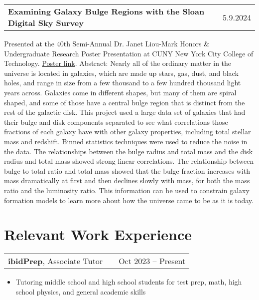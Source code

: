 \documentclass[a4paper,12pt]{article}
\makeatletter
\newenvironment{jobshort}[2]
    {
    \begin{tabularx}{\linewidth}{@{}X r@{}}
    {\raggedright\arraybackslash\nohyphens{#1}} & #2 \\[3.75pt]
    \end{tabularx}
    }
    {}
\newenvironment{joblong}[2]
    {
    \begin{tabularx}{\linewidth}{@{}l X r@{}}
    #1 & \hfill &  #2 \\[3.75pt]
    \end{tabularx}
    \begin{minipage}[t]{\linewidth}
    \begin{itemize}[nosep,after=\strut, leftmargin=1em, itemsep=3pt,label=--]
    }
    {
    \end{itemize}
    \end{minipage}    
    }
\makeatother
\begin{document}
\begin{jobshort}{\textbf{Examining Galaxy Bulge Regions with the Sloan Digital Sky Survey}}{5.9.2024}
Presented at the 40th Semi-Annual Dr. Janet Liou-Mark Honors \& Undergraduate Research Poster Presentation at CUNY New York City College of Technology. \href{https://academicworks.cuny.edu/ny_pubs/1137/}{Poster link}. Abstract: Nearly all of the ordinary matter in the universe is located in galaxies, which are made up stars, gas, dust, and black holes, and range in size from a few thousand to a few hundred thousand light years across. Galaxies come in different shapes, but many of them are spiral shaped, and some of those have a central bulge region that is distinct from the rest of the galactic disk. This project used a large data set of galaxies that had their bulge and disk components separated to see what correlations those fractions of each galaxy have with other galaxy properties, including total stellar mass and redshift. Binned statistics techniques were used to reduce the noise in the data. The relationships between the bulge radius and total mass and the disk radius and total mass showed strong linear correlations. The relationship between bulge to total ratio and total mass showed that the bulge fraction increases with mass dramatically at first and then declines slowly with mass, for both the mass ratio and the luminosity ratio. This information can be used to constrain galaxy formation models to learn more about how the universe came to be as it is today.
\end{jobshort}
  
\section{Relevant Work Experience}

\begin{joblong}{\textbf{ibidPrep}, Associate Tutor}{Oct 2023 -- Present}
\item Tutoring middle school and high school students for test prep, math, high school physics, and general academic skills
\end{joblong}
\end{document}

